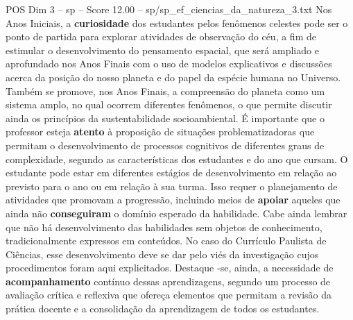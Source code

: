 \begin{textsample}{POS Dim 3 – sp – Score 12.00 – sp/sp\_ef\_ciencias\_da\_natureza\_3.txt}
Nos Anos Iniciais, a \textbf{curiosidade} dos estudantes pelos fenômenos celestes pode ser o ponto de partida para explorar atividades de observação do céu, a fim de estimular o desenvolvimento do pensamento espacial, que será ampliado e aprofundado nos Anos Finais com o uso de modelos explicativos e discussões acerca da posição do nosso planeta e do papel da espécie humana no Universo.
Também se promove, nos Anos Finais, a compreensão do planeta como um sistema amplo, no qual ocorrem diferentes fenômenos, o que permite discutir ainda os princípios da sustentabilidade socioambiental.
É importante que o professor esteja \textbf{atento} à proposição de situações problematizadoras que permitam o desenvolvimento de processos cognitivos de diferentes graus de complexidade, segundo as características dos estudantes e do ano que cursam.
O estudante pode estar em diferentes estágios de desenvolvimento em relação ao previsto para o ano ou em relação à sua turma.
Isso requer o planejamento de atividades que promovam a progressão, incluindo meios de \textbf{apoiar} aqueles que ainda não \textbf{conseguiram} o domínio esperado da habilidade.
Cabe ainda lembrar que não há desenvolvimento das habilidades sem objetos de conhecimento, tradicionalmente expressos em conteúdos.
No caso do Currículo Paulista de Ciências, esse desenvolvimento deve se dar pelo viés da investigação cujos procedimentos foram aqui explicitados.
Destaque -se, ainda, a necessidade de \textbf{acompanhamento} contínuo dessas aprendizagens, segundo um processo de avaliação crítica e reflexiva que ofereça elementos que permitam a revisão da prática docente e a consolidação da aprendizagem de todos os estudantes.

\end{textsample}
